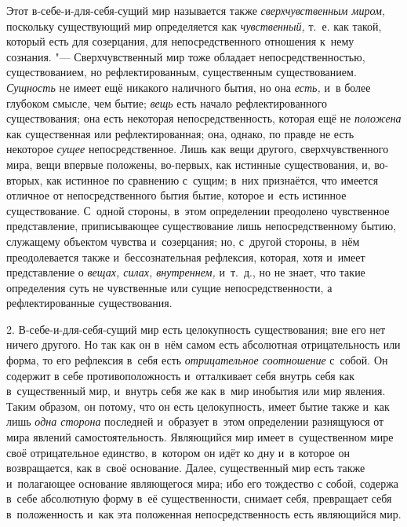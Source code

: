 Этот в-себе-и-для-себя-сущий мир называется также
{\em сверхчувственным миром,} поскольку существующий
мир определяется как {\em чувственный,} т.~е. как
такой, который есть для созерцания, для непосредственного отношения к~нему
сознания. "--- Сверхчувственный мир тоже обладает непосредственностью,
существованием, но рефлектированным, существенным существованием.
{\em Сущность} не имеет ещё никакого наличного бытия,
но она {\em есть,} и~в более глубоком смысле, чем
бытие; {\em вещь} есть начало рефлектированного
существования; она есть некоторая непосредственность, которая ещё не
{\em положена} как существенная или рефлектированная;
она, однако, по правде не есть некоторое {\em сущее}
непосредственное. Лишь как вещи другого, сверхчувственного мира, вещи
впервые положены, во-первых, как истинные существования, и, во-вторых, как
истинное по сравнению с~сущим; в~них признаётся, что имеется отличное от
непосредственного бытия бытие, которое и~есть истинное существование.
С~одной стороны, в~этом определении преодолено чувственное представление,
приписывающее существование лишь непосредственному бытию, служащему
объектом чувства и~созерцания; но, с~другой стороны, в~нём преодолевается
также и~бессознательная рефлексия, которая, хотя и~имеет представление о
{\em вещах, силах, внутреннем,} и~т.~д., но не знает,
что такие определения суть не чувственные или сущие непосредственности, а
рефлектированные существования.

2. В-себе-и-для-себя-сущий мир есть целокупность существования; вне его нет
ничего другого. Но так как он в~нём самом есть абсолютная отрицательность
или форма, то его рефлексия в~себя есть
{\em отрицательное соотношение} с~собой. Он содержит в
себе противоположность и~отталкивает себя внутрь себя как в~существенный
мир, и~внутрь себя же как в~мир инобытия или мир явления. Таким образом, он
потому, что он есть целокупность, имеет бытие также и~как лишь
{\em одна сторона} последней и~образует в~этом
определении разнящуюся от мира явлений самостоятельность. Являющийся мир
имеет в~существенном мире своё отрицательное единство, в~котором он идёт ко
дну и~в которое он возвращается, как в~своё основание. Далее, существенный
мир есть также и~полагающее основание являющегося мира; ибо его тождество с
собой, содержа в~себе абсолютную форму в~её существенности, снимает себя,
превращает себя в~положенность и~как эта положенная непосредственность есть
являющийся мир.

